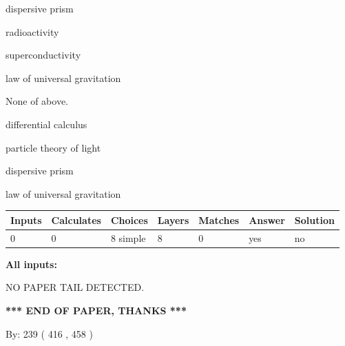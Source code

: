 \documentclass[12pt]{article}
\begin{document}
 
dispersive prism
 
 
radioactivity
 
 
superconductivity
 
 
law of universal gravitation
 
 
 None of above.
 
 
\noindent{}
 
 
differential calculus
 
 
particle theory of light
 
 
dispersive prism
 
 
law of universal gravitation
 
 
\noindent{}
 
 
   
   
   
   
\noindent\begin{tabular}{|l|l|l|l|l|l|l|}
 \hline
Inputs & Calculates & Choices & Layers & Matches & Answer & Solution \\ \hline
 0  & 
 0  & 
 8
  simple  
  & 
 8  & 
 0  & 
  yes & 
  no 
  \\ \hline
 \end{tabular}
   
   
   
   
\noindent{}
   
   
   
   
\noindent\vspace{0.1in}\hspace{-0.08in} {\textbf{\Large{All inputs: }}}
   
   
   
   
\vspace{2.0in} NO PAPER TAIL DETECTED.
   
   
   
   
\vspace{1.0in} 
{\textbf{\large{ *** END OF PAPER, THANKS *** }}} 
   
   
\hspace{1.0in} By: 
 239 ( 416 ,  458 )
   
\end{document}

